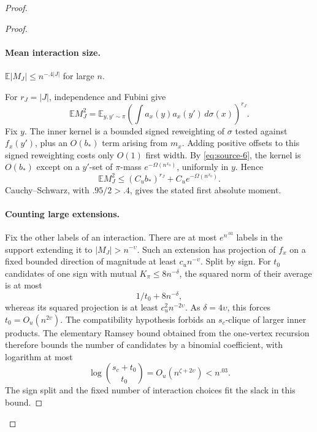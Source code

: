 \begin{proof}
\begin{proof}
\paragraph{Mean interaction size.}\label{par:jump-mean-interaction}
\(\mathbb E |M_J|\le n^{-.4|J|}\) for large \(n\).

For \(r_J=|J|\), independence and Fubini give
\[
 \mathbb E M_J^2
 =\mathbb E_{y,y'\sim\pi}
     \left(\int a_x(y)a_x(y')\,d\sigma(x)\right)^{r_J}.
\]
Fix \(y\). The inner kernel is a bounded signed reweighting of \(\sigma\) tested against \(f_x(y')\), plus an \(O(b_*)\) term arising from \(m_x\). Adding positive offsets to this signed reweighting costs only \(O(1)\) first width. By \eqref{eq:source-6}, the kernel is \(O(b_*)\) except on a \(y'\)-set of \(\pi\)-mass \(e^{-\Omega(n^{x_0})}\), uniformly in \(y\). Hence
\[
 \mathbb E M_J^2\le(C_u b_*)^{r_J}
                       +C_u e^{-\Omega(n^{x_0})}.
\]
Cauchy--Schwarz, with \(.95/2>.4\), gives the stated first absolute moment.

\paragraph{Counting large extensions.}
Fix the other labels of an interaction. There are at most \(e^{n^{.03}}\) labels in the support extending it to \(|M_J|>n^{-\upsilon}\). Such an extension has projection of \(f_x\) on a fixed bounded direction of magnitude at least \(c_un^{-\upsilon}\). Split by sign. For \(t_0\) candidates of one sign with mutual \(K_\pi\le8n^{-\delta}\), the squared norm of their average is at most
\[
 1/t_0+8n^{-\delta},
\]
whereas its squared projection is at least \(c_u^2n^{-2\upsilon}\). As \(\delta=4\upsilon\), this forces \(t_0=O_u(n^{2\upsilon})\). The compatibility hypothesis forbids an \(s_c\)-clique of larger inner products. The elementary Ramsey bound obtained from the one-vertex recursion therefore bounds the number of candidates by a binomial coefficient, with logarithm at most
\[
 \log\binom{s_c+t_0}{t_0}
       =O_u(n^{\zeta+2\upsilon})<n^{.03}.
\]
The sign split and the fixed number of interaction choices fit the slack in this bound.


\end{proof}
\end{proof}
